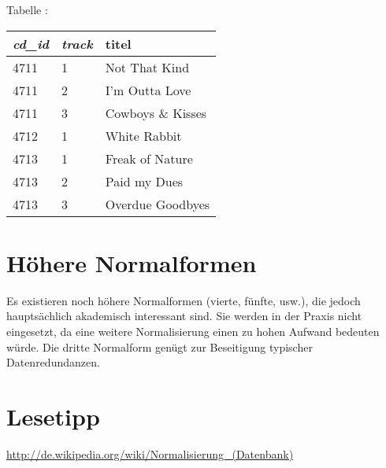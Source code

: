 \begin{minipage}{1.0\textwidth}
Tabelle :

\vspace{2mm}

\begin{tabular}{|l|l|l|}\hline
\textbf{\em cd\_id} & \textbf{\em track} & \textbf{titel}\\ \hline
4711 & 1 & Not That Kind\\ \hline
4711 & 2 & I'm Outta Love\\ \hline
4711 & 3 & Cowboys \& Kisses\\ \hline
4712 & 1 & White Rabbit\\ \hline
4713 & 1 & Freak of Nature\\ \hline
4713 & 2 & Paid my Dues\\ \hline
4713 & 3 & Overdue Goodbyes\\ \hline
\end{tabular}
\end{minipage}


\section{Höhere Normalformen}

Es existieren noch höhere Normalformen (vierte, fünfte, usw.), die jedoch
hauptsächlich akademisch interessant sind. Sie werden in der Praxis nicht
eingesetzt, da eine weitere Normalisierung einen zu hohen Aufwand bedeuten
würde. Die dritte Normalform genügt zur Beseitigung typischer Datenredundanzen.


\section{Lesetipp}

\url{http://de.wikipedia.org/wiki/Normalisierung_(Datenbank)}